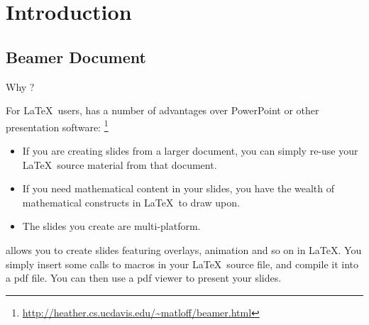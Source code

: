 
\newenvironment{fragileframe}{\begin{frame}[fragile,environment=fragileframe]}{\end{frame}}


\section{Introduction}

\subsection{Beamer Document}

\begin{frame}{Why ?}

For \LaTeX\ users,  has a number of advantages over PowerPoint or other presentation software: \footnote[1]{\url{http://heather.cs.ucdavis.edu/~matloff/beamer.html}}

\begin{itemize}
\item If you are creating slides from a larger document, you can simply re-use your \LaTeX\ source material from that document.
\item If you need mathematical content in your slides, you have the wealth of mathematical constructs in \LaTeX\ to draw upon.
\item The slides you create are multi-platform.
\end{itemize}\medskip

 allows you to create slides featuring overlays, animation and so on in \LaTeX. You simply insert some calls to  macros in your \LaTeX\ source file, and compile it into a pdf file. You can then use a pdf viewer to present your slides.

\end{frame}

